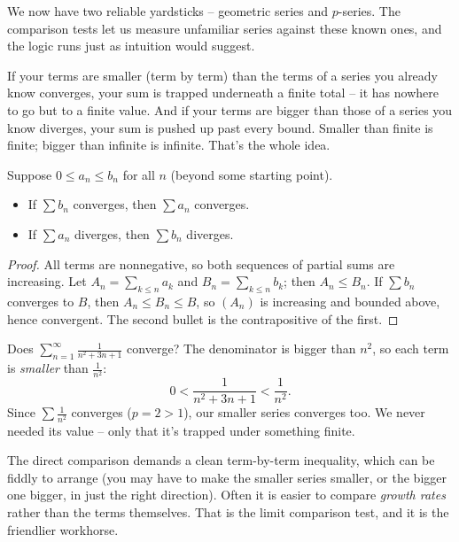 We now have two reliable yardsticks -- geometric series and $p$-series. The comparison tests let us measure unfamiliar series against these known ones, and the logic runs just as intuition would suggest.

\begin{intuitionbox}
If your terms are smaller (term by term) than the terms of a series you already know converges, your sum is trapped underneath a finite total -- it has nowhere to go but to a finite value. And if your terms are bigger than those of a series you know diverges, your sum is pushed up past every bound. Smaller than finite is finite; bigger than infinite is infinite. That's the whole idea.
\end{intuitionbox}

\begin{theorem}
\label{ch29:thm-comparison}
Suppose $0 \le a_n \le b_n$ for all $n$ (beyond some starting point).
\begin{itemize}
\item If $\sum b_n$ converges, then $\sum a_n$ converges.
\item If $\sum a_n$ diverges, then $\sum b_n$ diverges.
\end{itemize}
\end{theorem}

\begin{proof}
All terms are nonnegative, so both sequences of partial sums are increasing. Let $A_n=\sum_{k\le n} a_k$ and $B_n = \sum_{k\le n} b_k$; then $A_n \le B_n$. If $\sum b_n$ converges to $B$, then $A_n \le B_n \le B$, so $(A_n)$ is increasing and bounded above, hence convergent. The second bullet is the contrapositive of the first.
\end{proof}

\begin{example}
Does $\displaystyle\sum_{n=1}^\infty \frac{1}{n^2 + 3n + 1}$ converge? The denominator is bigger than $n^2$, so each term is \emph{smaller} than $\tfrac{1}{n^2}$:
\[
0 < \frac{1}{n^2+3n+1} < \frac{1}{n^2}.
\]
Since $\sum \tfrac1{n^2}$ converges ($p=2>1$), our smaller series converges too. We never needed its value -- only that it's trapped under something finite.
\end{example}

The direct comparison demands a clean term-by-term inequality, which can be fiddly to arrange (you may have to make the smaller series smaller, or the bigger one bigger, in just the right direction). Often it is easier to compare \emph{growth rates} rather than the terms themselves. That is the limit comparison test, and it is the friendlier workhorse.

